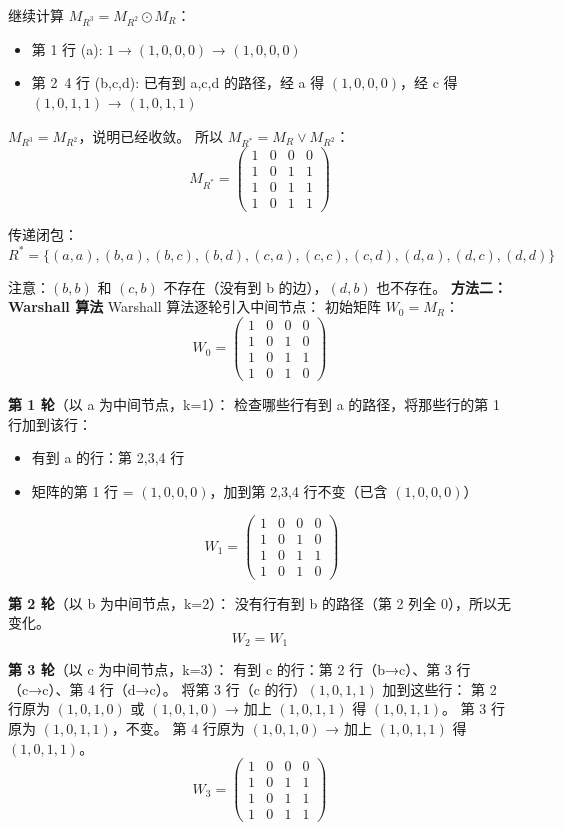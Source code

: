 \documentclass[10pt,a4paper,openany]{ctexbook}
\theoremstyle{definition}
\theoremstyle{remark}
\begin{document}
继续计算 $M_{R^3} = M_{R^2} \odot M_R$：
\begin{itemize}
\item 第 1 行 (a): $1 \to (1,0,0,0)$ → $(1,0,0,0)$
\item 第 2~4 行 (b,c,d): 已有到 a,c,d 的路径，经 a 得 $(1,0,0,0)$，经 c 得 $(1,0,1,1)$ → $(1,0,1,1)$

\end{itemize}

$M_{R^3} = M_{R^2}$，说明已经收敛。
所以 $M_{R^*} = M_R \lor M_{R^2}$：
\[
M_{R^*} = \begin{pmatrix}
1 & 0 & 0 & 0 \\
1 & 0 & 1 & 1 \\
1 & 0 & 1 & 1 \\
1 & 0 & 1 & 1
\end{pmatrix}
\]

传递闭包：
\[
R^* = \{(a,a), (b,a), (b,c), (b,d), (c,a), (c,c), (c,d), (d,a), (d,c), (d,d)\}
\]

注意：$(b,b)$ 和 $(c,b)$ 不存在（没有到 b 的边），$(d,b)$ 也不存在。
\textbf{方法二：Warshall 算法}
Warshall 算法逐轮引入中间节点：
初始矩阵 $W_0 = M_R$：
\[
W_0 = \begin{pmatrix}
1 & 0 & 0 & 0 \\
1 & 0 & 1 & 0 \\
1 & 0 & 1 & 1 \\
1 & 0 & 1 & 0
\end{pmatrix}
\]

\textbf{第 1 轮}（以 a 为中间节点，k=1）：
检查哪些行有到 a 的路径，将那些行的第 1 行加到该行：
\begin{itemize}
\item 有到 a 的行：第 2,3,4 行
\item 矩阵的第 1 行 = $(1,0,0,0)$，加到第 2,3,4 行不变（已含 $(1,0,0,0)$）

\[
W_1 = \begin{pmatrix}
1 & 0 & 0 & 0 \\
1 & 0 & 1 & 0 \\
1 & 0 & 1 & 1 \\
1 & 0 & 1 & 0
\end{pmatrix}
\]


\end{itemize}

\textbf{第 2 轮}（以 b 为中间节点，k=2）：
没有行有到 b 的路径（第 2 列全 0），所以无变化。
\[
W_2 = W_1
\]

\textbf{第 3 轮}（以 c 为中间节点，k=3）：
有到 c 的行：第 2 行（b→c）、第 3 行（c→c）、第 4 行（d→c）。
将第 3 行（c 的行）$(1,0,1,1)$ 加到这些行：
第 2 行原为 $(1,0,1,0)$ 或 $(1,0,1,0)$ → 加上 $(1,0,1,1)$ 得 $(1,0,1,1)$。
第 3 行原为 $(1,0,1,1)$，不变。
第 4 行原为 $(1,0,1,0)$ → 加上 $(1,0,1,1)$ 得 $(1,0,1,1)$。
\[
W_3 = \begin{pmatrix}
1 & 0 & 0 & 0 \\
1 & 0 & 1 & 1 \\
1 & 0 & 1 & 1 \\
1 & 0 & 1 & 1
\end{pmatrix}
\]
\end{document}
